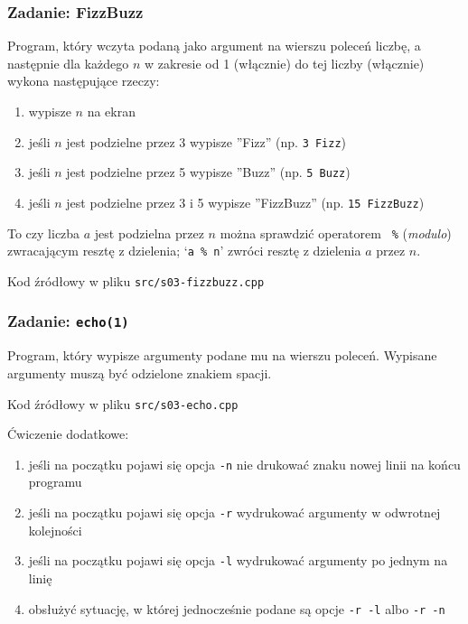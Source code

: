 \documentclass[aspectratio=169]{beamer}
\begin{document}
\begin{frame}[fragile]
    \frametitle{Zadanie: FizzBuzz}
    \label{lecture_exercise_3}

    Program, który wczyta podaną jako argument na wierszu poleceń liczbę, a
    następnie dla każdego $n$ w zakresie od 1 (włącznie) do tej liczby
    (włącznie) wykona następujące rzeczy:

    \begin{enumerate}
        \item wypisze $n$ na ekran
        \item jeśli $n$ jest podzielne przez 3 wypisze ''Fizz'' (np. {\tt 3
            Fizz})
        \item jeśli $n$ jest podzielne przez 5 wypisze ''Buzz'' (np. {\tt 5
            Buzz})
        \item jeśli $n$ jest podzielne przez 3 i 5 wypisze ''FizzBuzz'' (np.
            {\tt 15 FizzBuzz})
    \end{enumerate}

    To czy liczba $a$ jest podzielna przez $n$ można sprawdzić operatorem {\tt
    \%} (\emph{modulo}) zwracającym resztę z dzielenia; `{\tt a \% n}' zwróci
    resztę z dzielenia $a$ przez $n$.

    Kod źródłowy w pliku {\tt src/s03-fizzbuzz.cpp}
\end{frame}

\begin{frame}[fragile]
    \frametitle{Zadanie: {\tt echo(1)}}
    \label{lecture_exercise_4}

    Program, który wypisze argumenty podane mu na wierszu poleceń. Wypisane
    argumenty muszą być odzielone znakiem spacji.

    Kod źródłowy w pliku {\tt src/s03-echo.cpp}

    \vspace{1em}

    {\small
    Ćwiczenie dodatkowe:
    \begin{enumerate}
        \item jeśli na początku pojawi się opcja {\tt -n} nie drukować znaku
            nowej linii na końcu programu
        \item jeśli na początku pojawi się opcja {\tt -r} wydrukować
            argumenty w odwrotnej kolejności
        \item jeśli na początku pojawi się opcja {\tt -l} wydrukować argumenty
            po jednym na linię
        \item obsłużyć sytuację, w której jednocześnie podane są opcje {\tt -r
            -l} albo {\tt -r -n}
    \end{enumerate}}
\end{frame}
\end{document}
